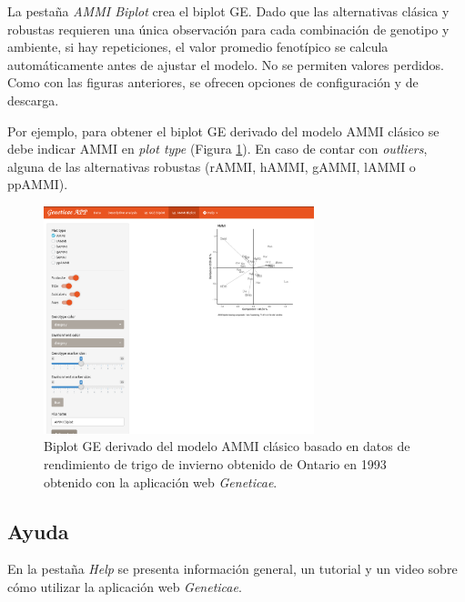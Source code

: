 La pestaña \emph{AMMI Biplot} crea el biplot GE. Dado que las alternativas clásica y robustas requieren una única observación para cada combinación de genotipo y ambiente, si hay repeticiones, el valor promedio fenotípico se calcula automáticamente antes de ajustar el modelo. No se permiten valores perdidos. Como con las figuras anteriores, se ofrecen opciones de configuración y de descarga.

Por ejemplo, para obtener el biplot GE derivado del modelo AMMI clásico se debe indicar AMMI en \emph{plot type} (Figura \ref{fig:figammiapp}). En caso de contar con \emph{outliers}, alguna de las alternativas robustas (rAMMI, hAMMI, gAMMI, lAMMI o ppAMMI).
 

\begin{figure}[h]
	\begin{center}
		\includegraphics[width=0.70\textwidth]{./Graficos/AMMI_GE.png}
	\end{center}
	\caption{Biplot GE derivado del modelo AMMI clásico basado en datos de rendimiento de trigo de invierno obtenido de Ontario en 1993 obtenido con la aplicación web \emph{Geneticae}.}
	\label{fig:figammiapp}
\end{figure}


\subsection{Ayuda}

En la pestaña \emph{Help} se presenta información general, un tutorial y un video sobre cómo utilizar la aplicación web \emph{Geneticae}.
